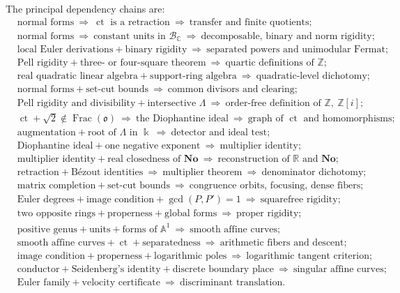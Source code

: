 \documentclass[11pt,oneside]{article}
\numberwithin{equation}{section}
\theoremstyle{definition}
\theoremstyle{remark}
\newcommand{\No}{\mathbf{No}}
\newcommand{\Z}{\mathbb Z}
\newcommand{\R}{\mathbb R}
\newcommand{\C}{\mathbb C}
\newcommand{\BC}{\mathcal B_{\C}}
\newcommand{\ct}{\operatorname{ct}}
\newcommand{\Frac}{\operatorname{Frac}}
\newcommand{\Aff}{\mathbb A}
\begin{document}
The principal dependency chains are:
\begin{align*}
 &\text{normal forms}\ \Longrightarrow\ \ct\text{ is a retraction}
 \ \Longrightarrow\ \text{transfer and finite quotients};\\
 &\text{normal forms}\ \Longrightarrow\ \text{constant units in }\BC
 \ \Longrightarrow\ \text{decomposable, binary and norm rigidity};\\
 &\text{local Euler derivations}+\text{binary rigidity}
 \ \Longrightarrow\ \text{separated powers and unimodular Fermat};\\
 &\text{Pell rigidity}+\text{three- or four-square theorem}
 \ \Longrightarrow\ \text{quartic definitions of }\Z;\\
 &\text{real quadratic linear algebra}+\text{support-ring algebra}
 \ \Longrightarrow\ \text{quadratic-level dichotomy};\\
 &\text{normal forms}+\text{set-cut bounds}
 \ \Longrightarrow\ \text{common divisors and clearing};\\
 &\text{Pell rigidity and divisibility}+\text{intersective }\Lambda
 \ \Longrightarrow\ \text{order-free definition of }\Z,\ \Z[i];\\
 &\ct+\sqrt2\notin\Frac(\mathfrak o)
 \ \Longrightarrow\ \text{the Diophantine ideal}
 \ \Longrightarrow\ \text{graph of }\ct\text{ and homomorphisms};\\
 &\text{augmentation}+\text{root of }\Lambda\text{ in }\Bbbk
 \ \Longrightarrow\ \text{detector and ideal test};\\
 &\text{Diophantine ideal}+\text{one negative exponent}
 \ \Longrightarrow\ \text{multiplier identity};\\
 &\text{multiplier identity}+\text{real closedness of }\No
 \ \Longrightarrow\ \text{reconstruction of }\R\text{ and }\No ;\\
 &\text{retraction}+\text{B\'ezout identities}
 \ \Longrightarrow\ \text{multiplier theorem}
 \ \Longrightarrow\ \text{denominator dichotomy};\\
 &\text{matrix completion}+\text{set-cut bounds}
 \ \Longrightarrow\ \text{congruence orbits, focusing, dense fibers};\\
 &\text{Euler degrees}+\text{image condition}+\gcd(P,P')=1
 \ \Longrightarrow\ \text{squarefree rigidity};\\
 &\text{two opposite rings}+\text{properness}+\text{global forms}
 \ \Longrightarrow\ \text{proper rigidity};\\
 &\text{positive genus}+\text{units}+\text{forms of }\Aff^1
 \ \Longrightarrow\ \text{smooth affine curves};\\
 &\text{smooth affine curves}+\ct+\text{separatedness}
 \ \Longrightarrow\ \text{arithmetic fibers and descent};\\
 &\text{image condition}+\text{properness}+\text{logarithmic poles}
 \ \Longrightarrow\ \text{logarithmic tangent criterion};\\
 &\text{conductor}+\text{Seidenberg's identity}+\text{discrete boundary place}
 \ \Longrightarrow\ \text{singular affine curves};\\
 &\text{Euler family}+\text{velocity certificate}
 \ \Longrightarrow\ \text{discriminant translation}.
\end{align*}
\end{document}
